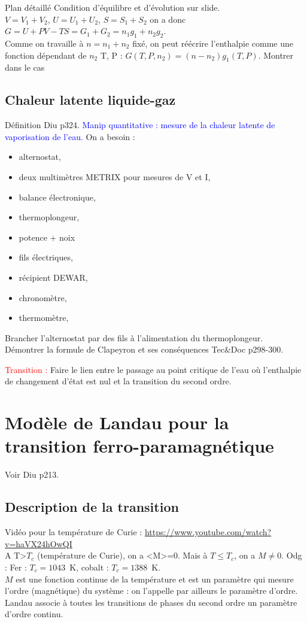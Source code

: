 \begin{reportBlock}{Plan détaillé}
  Condition d'équilibre et d'évolution sur slide.\\
  
  $V = V_1 +V_2$, $U=U_1+U_2$, $S=S_1+S_2$ on a donc $G=U+PV-TS = G_1+G_2 = n_1g_{1}+n_2g_{2}$.\\
  Comme on travaille à $n=n_1+n_2$ fixé, on peut réécrire l'enthalpie comme une fonction dépendant de $n_2$ T, P : $G(T,P,n_2) = (n-n_2)g_1(T,P)$.
  Montrer dans le cas 
  
  
  \subsection{Chaleur latente liquide-gaz}
  Définition Diu p324. \textcolor{blue}{Manip quantitative : mesure de la chaleur latente de vaporisation de l'eau.} On a besoin : 
  \begin{itemize}
      \item alternostat,
      \item deux multimètres METRIX pour mesures de V et I,
      \item balance électronique,
      \item thermoplongeur,
      \item potence + noix 
      \item fils électriques,
      \item récipient DEWAR,
      \item chronomètre,
      \item thermomètre,
  \end{itemize} 
  Brancher l'alternostat par des fils à l'alimentation du thermoplongeur. \\
  Démontrer la formule de Clapeyron et ses conséquences Tec\&Doc p298-300.

  \textcolor{red}{Transition :} Faire le lien entre le passage au point critique de l'eau où l'enthalpie de changement d'état est nul et la transition du second ordre.

  \section{Modèle de Landau pour la transition ferro-paramagnétique}
  Voir Diu p213.

  \subsection{Description de la transition}
  Vidéo pour la température de Curie : \url{https://www.youtube.com/watch?v=haVX24hOwQI}\\
  A T>$T_c$ (température de Curie), on a <M>=0. Mais à $T\leq T_c$, on a $M\ne 0$. Odg : Fer : $T_c=1043$~K, cobalt : $T_c=1388$~K. \\
  $M$ est une fonction continue de la température et est un paramètre qui mesure l'ordre (magnétique) du système : on l'appelle par ailleurs le paramètre d'ordre. Landau associe à toutes les transitions de phases du second ordre un paramètre d'ordre continu.
  

\end{reportBlock}
